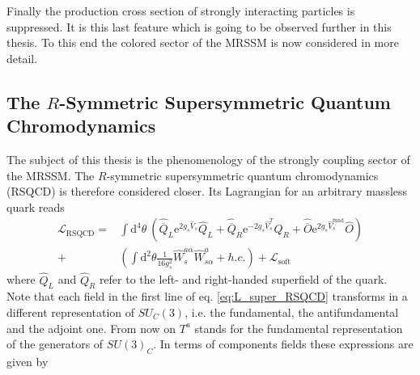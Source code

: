 Finally the production cross section of strongly interacting particles is suppressed\cite{Kribs:2012gx, Kribs:2013oda}. It is this last feature which is going to be observed further in this thesis. To this end the colored sector of the MRSSM is now considered in more detail.


\subsection{The $R$-Symmetric Supersymmetric Quantum Chromodynamics}
The subject of this thesis is the phenomenology of the strongly coupling sector of the MRSSM. The $R$-symmetric supersymmetric quantum chromodynamics (RSQCD) is therefore considered closer. Its Lagrangian for an arbitrary massless quark reads
\begin{align}
\mathcal{L}_{\mathrm{RSQCD}} = &\int\mathrm{d}^4\theta\ \left( \hat{\overline{Q}}_L \mathrm{e}^{2g_s\hat{V}_s} \hat{Q}_L + \hat{\overline{Q}}_R \mathrm{e}^{-2g_s\hat{V}^T_s} \hat{Q}_R + \hat{\overline{O}} \mathrm{e}^{2g_s\hat{V}^{\mathrm{fund}}_s} \hat{O}\right)\nonumber\\
+& \left( \int \mathrm{d}^2\theta \frac{1}{16g_s^2} \hat{W}_s^{a\alpha}\hat{W}^a_{s\alpha} + h.c. \right) + \mathcal{L}_{\mathrm{soft}}\label{eq:L_super_RSQCD}
\end{align}
where $\hat{Q}_L$ and $\hat{Q}_R$ refer to the left- and right-handed superfield of the quark. Note that each field in the first line of eq. \eqref{eq:L_super_RSQCD} transforms in a different representation of $SU_C(3)$, i.e. the fundamental, the antifundamental and the adjoint one. From now on $T^a$ stands for the fundamental representation of the generators of $SU(3)_C$. In terms of components fields these expressions are given by
